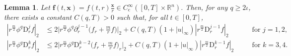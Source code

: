 \documentclass[11pt,reqno]{amsart}
\newtheorem{lem}{Lemma}[section]
\numberwithin{rk}{section}
\numberwithin{prop}{section}
\numberwithin{mydef}{section}
\numberwithin{lem}{section}
\numberwithin{equation}{section}
\numberwithin{thm}{section}
\begin{document}
\begin{lem}\label{im-2}
Let $\boldsymbol{f}(t,\boldsymbol{x})=f(t,r)\frac{\boldsymbol{x}}{r}\in C_\mathrm{c}^\infty([0,T]\times\mathbb{R}^n)$. Then, for any $q\geq 2\iota$, there exists a constant $C(q,T)>0$ such that, for all $t\in [0,T]$,
\begin{equation*}
\begin{aligned}
|r^\frac{m}{2}\phi^{q}\mathrm{D}_r^j f|_2&\leq 2\Big|r^\frac{m}{2}\phi^{q}\partial_r^{j-1}\big(f_r+\frac{m}{r}f\big)\Big|_2+C(q,T) (1+|u|_\infty)|r^\frac{m}{2}\mathrm{D}_r^{j-1}f|_2\quad&&\text{for $j=1,2$},\\
|r^\frac{m}{2}\phi^{q}\mathrm{D}_r^k f|_2&\leq 2\Big|r^\frac{m}{2}\phi^q \mathrm{D}_r^{k-2}\big(f_r+ \frac{m}{r}f\big)_{r}\Big|_2+C(q,T)(1+|u|_\infty)|r^\frac{m}{2} \mathrm{D}_r^{k-1} f|_2\quad&&\text{for $k=3,4$}.
\end{aligned}
\end{equation*}
\end{lem}
\end{document}
